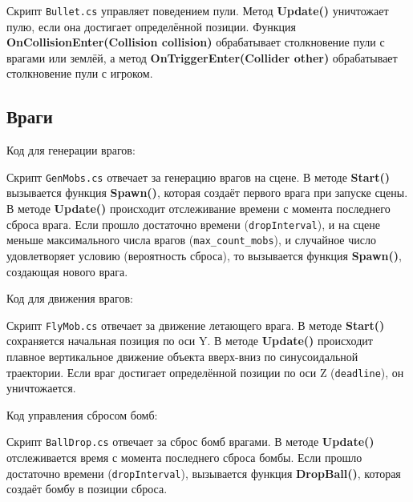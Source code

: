 Скрипт \texttt{Bullet.cs} управляет поведением пули.
Метод \textbf{Update()} уничтожает пулю,
если она достигает определённой позиции.
Функция \textbf{OnCollisionEnter(Collision collision)}
обрабатывает столкновение пули с врагами или землёй,
а метод \textbf{OnTriggerEnter(Collider other)}
обрабатывает столкновение пули с игроком.

\subsection{Враги}                                                             
                                                                               
Код для генерации врагов:                                                      


Скрипт \texttt{GenMobs.cs} отвечает за генерацию врагов на сцене.
В методе \textbf{Start()} вызывается функция \textbf{Spawn()},
которая создаёт первого врага при запуске сцены.
В методе \textbf{Update()} происходит отслеживание времени
с момента последнего сброса врага.
Если прошло достаточно времени (\texttt{dropInterval}),
и на сцене меньше максимального числа врагов (\texttt{max\_count\_mobs}),
и случайное число удовлетворяет условию (вероятность сброса),
то вызывается функция \textbf{Spawn()}, создающая нового врага.

Код для движения врагов:                                                           


Скрипт \texttt{FlyMob.cs} отвечает за движение летающего врага.
В методе \textbf{Start()} сохраняется начальная позиция по оси Y.
В методе \textbf{Update()} происходит плавное вертикальное движение
объекта вверх-вниз по синусоидальной траектории.
Если враг достигает определённой позиции по оси Z (\texttt{deadline}),
он уничтожается.

Код управления сбросом бомб:                                                  


Скрипт \texttt{BallDrop.cs} отвечает за сброс бомб врагами.
В методе \textbf{Update()} отслеживается время
с момента последнего сброса бомбы.
Если прошло достаточно времени (\texttt{dropInterval}),
вызывается функция \textbf{DropBall()},
которая создаёт бомбу в позиции сброса.

